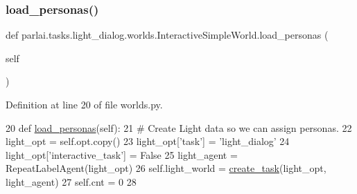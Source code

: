 \mbox{\label{classparlai_1_1tasks_1_1light__dialog_1_1worlds_1_1InteractiveSimpleWorld_a80912ce3904fd06850c824311c7d2731}} 
\subsubsection{\texorpdfstring{load\+\_\+personas()}{load\_personas()}}
{\footnotesize\ttfamily def parlai.\+tasks.\+light\+\_\+dialog.\+worlds.\+Interactive\+Simple\+World.\+load\+\_\+personas (\begin{DoxyParamCaption}\item[{}]{self }\end{DoxyParamCaption})}



Definition at line 20 of file worlds.\+py.


\begin{DoxyCode}
20     \textcolor{keyword}{def }\hyperlink{namespaceparlai_1_1tasks_1_1convai2_1_1worlds_a61a758b7cb43183397d002f7f203f586}{load\_personas}(self):
21         \textcolor{comment}{# Create Light data so we can assign personas.}
22         light\_opt = self.opt.copy()
23         light\_opt[\textcolor{stringliteral}{'task'}] = \textcolor{stringliteral}{'light\_dialog'}
24         light\_opt[\textcolor{stringliteral}{'interactive\_task'}] = \textcolor{keyword}{False}
25         light\_agent = RepeatLabelAgent(light\_opt)
26         self.light\_world = \hyperlink{namespaceparlai_1_1core_1_1worlds_a11923c10b545c7ecc1b08fe2242d9c2c}{create\_task}(light\_opt, light\_agent)
27         self.cnt = 0
28 
\end{DoxyCode}
\mbox{\label{classparlai_1_1tasks_1_1light__dialog_1_1worlds_1_1InteractiveSimpleWorld_a7c10da25fd2d140416bb915b95ff603e}} 
